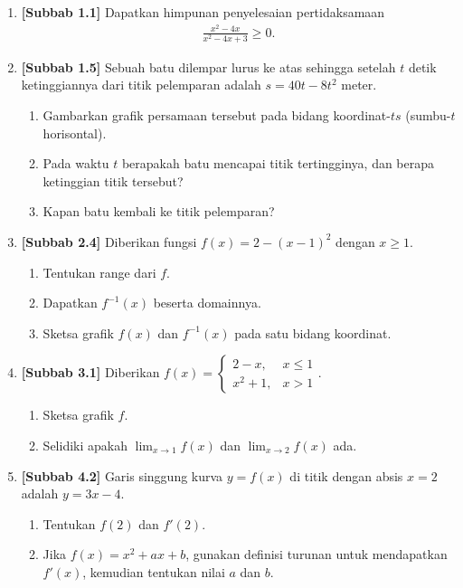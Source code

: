 \documentclass[10pt,openany,a4paper]{article}
\theoremstyle{definition}
\theoremstyle{definition}
\theoremstyle{plain}
\begin{document}
\begin{enumerate}
    \item \textbf{[Subbab 1.1]} Dapatkan himpunan penyelesaian pertidaksamaan
    \begin{align*}
        \frac{x^2-4x}{x^2-4x+3}\geq 0.
    \end{align*}

    \item \textbf{[Subbab 1.5]} Sebuah batu dilempar lurus ke atas sehingga setelah $t$ detik ketinggiannya dari titik pelemparan adalah $s=40t-8t^2$ meter.
    \begin{enumerate}
        \item Gambarkan grafik persamaan tersebut pada bidang koordinat-$ts$ (sumbu-$t$ horisontal).
        \item Pada waktu $t$ berapakah batu mencapai titik tertingginya, dan berapa ketinggian titik tersebut?
        \item Kapan batu kembali ke titik pelemparan?
    \end{enumerate}

    \item \textbf{[Subbab 2.4]} Diberikan fungsi $f(x)=2-(x-1)^2$ dengan $x\geq 1$.
    \begin{enumerate}
        \item Tentukan range dari $f$.
        \item Dapatkan $f^{-1}(x)$ beserta domainnya.
        \item Sketsa grafik $f(x)$ dan $f^{-1}(x)$ pada satu bidang koordinat.
    \end{enumerate}

    \item \textbf{[Subbab 3.1]} Diberikan $f(x)=\begin{cases}
        2-x, & x\leq 1\\
        x^2+1, & x>1
    \end{cases}$.
    \begin{enumerate}
        \item Sketsa grafik $f$.
        \item Selidiki apakah $\displaystyle\lim_{x\to 1}f(x)$ dan $\displaystyle\lim_{x\to 2}f(x)$ ada.
    \end{enumerate}

    \item \textbf{[Subbab 4.2]} Garis singgung kurva $y=f(x)$ di titik dengan absis $x=2$ adalah $y=3x-4$.
    \begin{enumerate}
        \item Tentukan $f(2)$ dan $f'(2)$.
        \item Jika $f(x)=x^2+ax+b$, gunakan definisi turunan untuk mendapatkan $f'(x)$, kemudian tentukan nilai $a$ dan $b$.
    \end{enumerate}
\end{enumerate}
\end{document}
